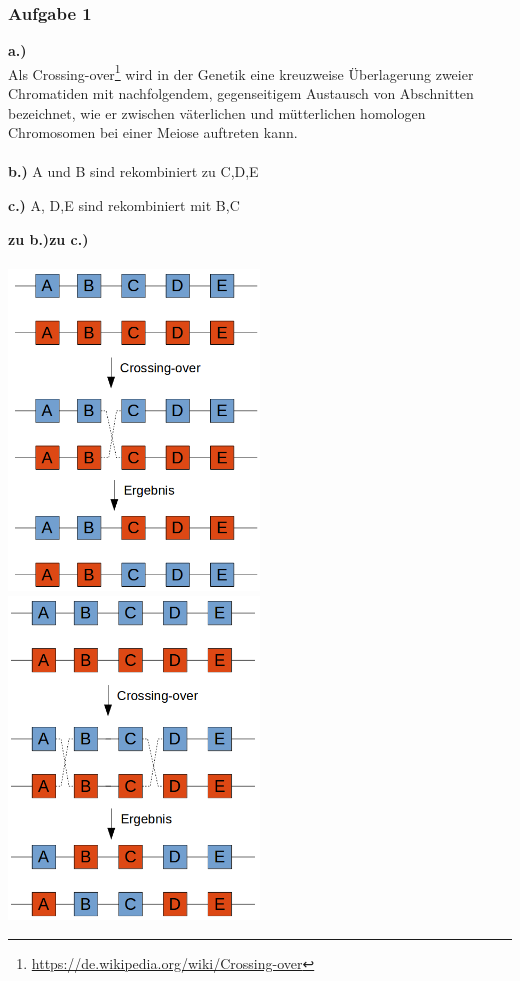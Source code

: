 \subsubsection{Aufgabe 1}
\textbf{a.)}\\
Als Crossing-over\footnote{\url{https://de.wikipedia.org/wiki/Crossing-over}} wird in der Genetik eine kreuzweise Überlagerung zweier Chromatiden mit nachfolgendem, gegenseitigem Austausch von Abschnitten bezeichnet, wie er zwischen väterlichen und mütterlichen homologen Chromosomen bei einer Meiose auftreten kann.
\\\\

\textbf{b.)} A und B sind rekombiniert zu C,D,E

\textbf{c.)} A, D,E sind rekombiniert mit B,C

\textbf{zu b.)}\hspace*{65mm}\textbf{zu c.)}\\\\
\includegraphics[width=0.5\textwidth]{lectures/V2/pix/crossing_over_b.png}
\includegraphics[width=0.5\textwidth]{lectures/V2/pix/crossing_over_c.png}

